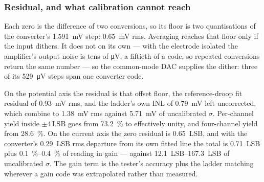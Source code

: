 
\subsubsection{Residual, and what calibration cannot reach}
\label{sss:calibration-residual}

Each zero is the difference of two conversions, so its floor is two
quantisations of the converter's \SI{1.591}{\milli\volt} step:
\SI{0.65}{\milli\volt} rms. Averaging reaches that floor only if the input
dithers. It does not on its own --- with the electrode isolated the amplifier's
output noise is tens of \si{\micro\volt}, a fiftieth of a code, so repeated
conversions return the same number --- so the common-mode DAC supplies the
dither: three of its \SI{529}{\micro\volt} steps span one converter code.

On the potential axis the residual is that offset floor, the reference-droop
fit residual of \SI{0.93}{\milli\volt} rms, and the ladder's own INL of
\SI{0.79}{\milli\volt} left uncorrected, which combine to
\SI{1.38}{\milli\volt} rms against \SI{5.71}{\milli\volt} of uncalibrated
\(\sigma\). Per-channel yield inside \(\pm4\,\mathrm{LSB}\) goes from
\SI{73.2}{\percent} to effectively unity, and four-channel yield from
\SI{28.6}{\percent}. On the current axis the zero residual is
\SI{0.65}{LSB}, and with the converter's \SI{0.29}{LSB} rms departure from its
own fitted line the total is \SI{0.71}{LSB} plus \SIrange{0.1}{0.4}{\percent} of
reading in gain --- against \SIrange{12.1}{167.3}{LSB} of uncalibrated
\(\sigma\). The gain term is the tester's accuracy plus the ladder matching
wherever a gain code was extrapolated rather than measured.

